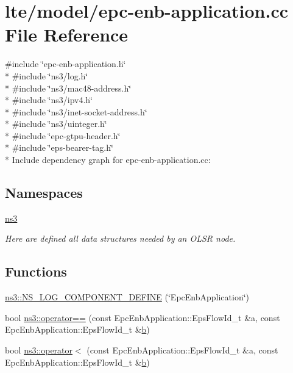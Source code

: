 \hypertarget{epc-enb-application_8cc}{}\section{lte/model/epc-\/enb-\/application.cc File Reference}
\label{epc-enb-application_8cc}
{\ttfamily \#include \char`\"{}epc-\/enb-\/application.\+h\char`\"{}}\\*
{\ttfamily \#include \char`\"{}ns3/log.\+h\char`\"{}}\\*
{\ttfamily \#include \char`\"{}ns3/mac48-\/address.\+h\char`\"{}}\\*
{\ttfamily \#include \char`\"{}ns3/ipv4.\+h\char`\"{}}\\*
{\ttfamily \#include \char`\"{}ns3/inet-\/socket-\/address.\+h\char`\"{}}\\*
{\ttfamily \#include \char`\"{}ns3/uinteger.\+h\char`\"{}}\\*
{\ttfamily \#include \char`\"{}epc-\/gtpu-\/header.\+h\char`\"{}}\\*
{\ttfamily \#include \char`\"{}eps-\/bearer-\/tag.\+h\char`\"{}}\\*
Include dependency graph for epc-\/enb-\/application.cc\+:
\subsection*{Namespaces}
\begin{DoxyCompactItemize}
\item 
 \hyperlink{namespacens3}{ns3}
\begin{DoxyCompactList}\small\item\em Here are defined all data structures needed by an O\+L\+SR node. \end{DoxyCompactList}\end{DoxyCompactItemize}
\subsection*{Functions}
\begin{DoxyCompactItemize}
\item 
\hyperlink{namespacens3_a72dbf62cb12bca59d283675fa54244c1}{ns3\+::\+N\+S\+\_\+\+L\+O\+G\+\_\+\+C\+O\+M\+P\+O\+N\+E\+N\+T\+\_\+\+D\+E\+F\+I\+NE} (\char`\"{}Epc\+Enb\+Application\char`\"{})
\item 
bool \hyperlink{namespacens3_ab9776d4353859ac35fbf9c691872828c}{ns3\+::operator==} (const Epc\+Enb\+Application\+::\+Eps\+Flow\+Id\+\_\+t \&a, const Epc\+Enb\+Application\+::\+Eps\+Flow\+Id\+\_\+t \&\hyperlink{lte__pathloss_8m_a21ad0bd836b90d08f4cf640b4c298e7c}{b})
\item 
bool \hyperlink{namespacens3_a684d7687258f85a740ea4064a9bd8b2f}{ns3\+::operator$<$} (const Epc\+Enb\+Application\+::\+Eps\+Flow\+Id\+\_\+t \&a, const Epc\+Enb\+Application\+::\+Eps\+Flow\+Id\+\_\+t \&\hyperlink{lte__pathloss_8m_a21ad0bd836b90d08f4cf640b4c298e7c}{b})
\end{DoxyCompactItemize}
